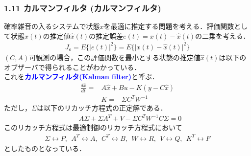 \documentclass[10pt]{beamer}
\begin{document}
\begin{frame}[t]
\frametitle{1.11 カルマンフィルタ (カルマンフィルタ)}
確率雑音の入るシステムで状態$x$を最適に推定する問題を考える．評価関数として状態$x(t)$の推定値$\hat{x}(t)$の推定誤差$e(t) = x(t) - \hat{x}(t)$の二乗を考える．
\begin{align}
     J_o = E\{ \vert e(t) \vert^2 \} = E\{ \vert x(t) - \hat{x}(t) \vert^2 \}
\end{align}
$(C,A)$可観測の場合，この評価関数を最小とする状態の推定値$\hat{x}(t)$は以下のオブザーバで得られることがわかっている．\\
これを\textcolor{blue}{\bf カルマンフィルタ(Kalman filter)}と呼ぶ．
\begin{align}
 \frac{d \hat{x}}{dt} =& A \hat{x} + B u - K (y - C \hat{x})
\\
 & K = -\Sigma C^T W^{-1}
\end{align}
ただし，$\Sigma$は以下のリカッチ方程式の正定解である．
\begin{align}
 & A \Sigma + \Sigma A^T +  V - \Sigma C^T W^{-1} C \Sigma = 0

\end{align}
このリカッチ方程式は最適制御のリカッチ方程式において
\begin{align}
   \Sigma \leftrightarrow P,   \ \
   A^T    \leftrightarrow A, \ \
   C^T    \leftrightarrow B, \ \
   W      \leftrightarrow R, \ \
   V      \leftrightarrow Q, \ \
   K^T    \leftrightarrow F
\end{align}
としたものとなっている．
\end{frame}
\end{document}
